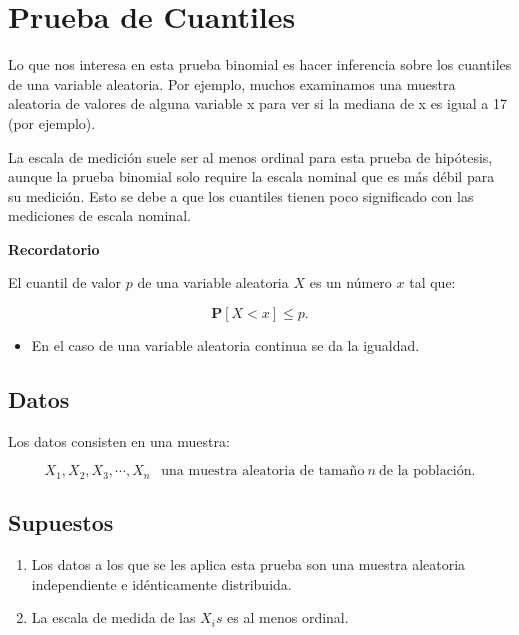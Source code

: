 \documentclass[
  a4paper,
  oneside,
  openany]{book}
\providecommand{\tightlist}{%
  \setlength{\itemsep}{0pt}\setlength{\parskip}{0pt}}
\begin{document}
\hypertarget{prueba-de-cuantiles}{%
\chapter{Prueba de Cuantiles}\label{prueba-de-cuantiles}}

Lo que nos interesa en esta prueba binomial es hacer inferencia sobre los cuantiles de una variable aleatoria. Por ejemplo, muchos examinamos una muestra aleatoria de valores de alguna variable x para ver si la mediana de x es igual a 17 (por ejemplo).

La escala de medición suele ser al menos ordinal para esta prueba de hipótesis, aunque la prueba binomial solo require la escala nominal que es más débil para su medición. Esto se debe a que los cuantiles tienen poco significado con las mediciones de escala nominal.

\textbf{Recordatorio}

El cuantil de valor \(p\) de una variable aleatoria \(X\)
es un número \(x\) tal que:

\[ \mathbf{P}[X < x]\leq p.\]

\begin{itemize}
\tightlist
\item
  En el caso de una variable aleatoria continua se da la igualdad.
\end{itemize}

\hypertarget{datos-1}{%
\section{Datos}\label{datos-1}}

Los datos consisten en una muestra:

\[X_{1},X_{2},X_{3},\cdots,X_{n}  \  \ \mbox{ una muestra aleatoria de tamaño} \ n \  \mbox{de la población}.\]

\hypertarget{supuestos-1}{%
\section{Supuestos}\label{supuestos-1}}

\begin{enumerate}
\def\labelenumi{\arabic{enumi})}
\item
  Los datos a los que se les aplica esta prueba son una muestra aleatoria independiente e idénticamente distribuida.
\item
  La escala de medida de las \(X_{i}s\) es al menos ordinal.
\end{enumerate}
\end{document}
